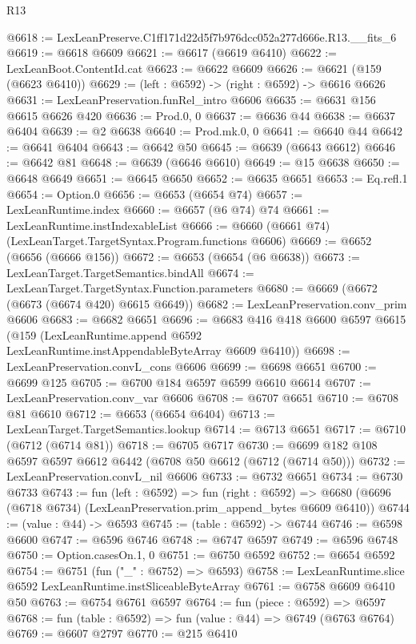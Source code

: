 \begin{lexlean}{R13}
\begin{coremodule}
@6618 := LexLeanPreserve.C1ff171d22d5f7b976dcc052a277d666e.R13.__fits_6
@6619 := @6618 @6609
@6621 := @6617 (@6619 @6410)
@6622 := LexLeanBoot.ContentId.cat
@6623 := @6622 @6609
@6626 := @6621 (@159 (@6623 @6410))
@6629 := (left : @6592) -> (right : @6592) -> @6616 @6626
@6631 := LexLeanPreservation.funRel_intro @6606
@6635 := @6631 @156 @6615 @6626 @420
@6636 := Prod.{0, 0}
@6637 := @6636 @44
@6638 := @6637 @6404
@6639 := @2 @6638
@6640 := Prod.mk.{0, 0}
@6641 := @6640 @44
@6642 := @6641 @6404
@6643 := @6642 @50
@6645 := @6639 (@6643 @6612)
@6646 := @6642 @81
@6648 := @6639 (@6646 @6610)
@6649 := @15 @6638
@6650 := @6648 @6649
@6651 := @6645 @6650
@6652 := @6635 @6651
@6653 := Eq.refl.{1}
@6654 := Option.{0}
@6656 := @6653 (@6654 @74)
@6657 := LexLeanRuntime.index
@6660 := @6657 (@6 @74) @74
@6661 := LexLeanRuntime.instIndexableList
@6666 := @6660 (@6661 @74) (LexLeanTarget.TargetSyntax.Program.functions @6606)
@6669 := @6652 (@6656 (@6666 @156))
@6672 := @6653 (@6654 (@6 @6638))
@6673 := LexLeanTarget.TargetSemantics.bindAll
@6674 := LexLeanTarget.TargetSyntax.Function.parameters
@6680 := @6669 (@6672 (@6673 (@6674 @420) @6615 @6649))
@6682 := LexLeanPreservation.conv_prim @6606
@6683 := @6682 @6651
@6696 := @6683
    @416
    @418
    @6600
    @6597
    @6615
    (@159 (LexLeanRuntime.append @6592 LexLeanRuntime.instAppendableByteArray @6609 @6410))
@6698 := LexLeanPreservation.convL_cons @6606
@6699 := @6698 @6651
@6700 := @6699 @125
@6705 := @6700 @184 @6597 @6599 @6610 @6614
@6707 := LexLeanPreservation.conv_var @6606
@6708 := @6707 @6651
@6710 := @6708 @81 @6610
@6712 := @6653 (@6654 @6404)
@6713 := LexLeanTarget.TargetSemantics.lookup
@6714 := @6713 @6651
@6717 := @6710 (@6712 (@6714 @81))
@6718 := @6705 @6717
@6730 := @6699 @182 @108 @6597 @6597 @6612 @6442 (@6708 @50 @6612 (@6712 (@6714 @50)))
@6732 := LexLeanPreservation.convL_nil @6606
@6733 := @6732 @6651
@6734 := @6730 @6733
@6743 := fun (left : @6592) =>
  fun (right : @6592) =>
  @6680 (@6696 (@6718 @6734) (LexLeanPreservation.prim_append_bytes @6609 @6410))
@6744 := (value : @44) -> @6593
@6745 := (table : @6592) -> @6744
@6746 := @6598 @6600
@6747 := @6596 @6746
@6748 := @6747 @6597
@6749 := @6596 @6748
@6750 := Option.casesOn.{1, 0}
@6751 := @6750 @6592
@6752 := @6654 @6592
@6754 := @6751 (fun ("_" : @6752) => @6593)
@6758 := LexLeanRuntime.slice @6592 LexLeanRuntime.instSliceableByteArray
@6761 := @6758 @6609 @6410 @50
@6763 := @6754 @6761 @6597
@6764 := fun (piece : @6592) => @6597
@6768 := fun (table : @6592) => fun (value : @44) => @6749 (@6763 @6764)
@6769 := @6607 @2797
@6770 := @215 @6410

\end{coremodule}
\end{lexlean}

